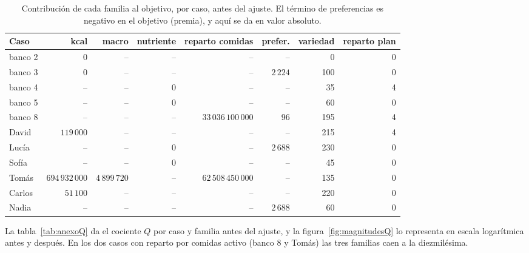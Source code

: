 \begin{table}[htbp]
\centering
\scriptsize
\setlength{\tabcolsep}{4pt}
\begin{tabular}{|l|r|r|r|r|r|r|r|}
\hline
\textbf{Caso} & \textbf{kcal} & \textbf{macro} & \textbf{nutriente} & \textbf{reparto comidas} & \textbf{prefer.} & \textbf{variedad} & \textbf{reparto plan} \\
\hline
banco 2 & 0 & -- & -- & -- & -- & 0 & 0 \\
\hline
banco 3 & 0 & -- & -- & -- & $2\,224$ & 100 & 0 \\
\hline
banco 4 & -- & -- & 0 & -- & -- & 35 & 4 \\
\hline
banco 5 & -- & -- & 0 & -- & -- & 60 & 0 \\
\hline
banco 8 & -- & -- & -- & $33\,036\,100\,000$ & 96 & 195 & 4 \\
\hline
David & $119\,000$ & -- & -- & -- & -- & 215 & 4 \\
\hline
Lucía & -- & -- & 0 & -- & $2\,688$ & 230 & 0 \\
\hline
Sofía & -- & -- & 0 & -- & -- & 45 & 0 \\
\hline
Tomás & $694\,932\,000$ & $4\,899\,720$ & -- & $62\,508\,450\,000$ & -- & 135 & 0 \\
\hline
Carlos & $51\,100$ & -- & -- & -- & -- & 220 & 0 \\
\hline
Nadia & -- & -- & -- & -- & $2\,688$ & 60 & 0 \\
\hline
\end{tabular}
\caption{Contribución de cada familia al objetivo, por caso, antes del ajuste. El término de preferencias es negativo en el objetivo (premia), y aquí se da en valor absoluto.}
\label{tab:anexoContribuciones}
\end{table}

La tabla~\ref{tab:anexoQ} da el cociente $Q$ por caso y familia antes del ajuste, y la figura~\ref{fig:magnitudesQ} lo representa en escala logarítmica antes y después. En los dos casos con reparto por comidas activo (banco 8 y Tomás) las tres familias caen a la diezmilésima.

